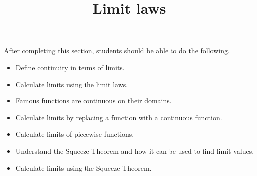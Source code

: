 \documentclass{ximera}
\title{Limit laws}
\begin{document}
\begin{abstract}
\end{abstract}

\maketitle

\begin{sectionOutcomes}
After completing this section, students should be able to do the following.

\begin{itemize}
\item Define continuity in terms of limits.
\item Calculate limits using the limit laws.
\item Famous functions are continuous on their domains. 
\item Calculate limits by replacing a function with a continuous
  function.
\item Calculate limits of piecewise functions.
\item Understand the Squeeze Theorem and how it can be used to find limit values.
\item Calculate limits using the Squeeze Theorem.
\end{itemize}
\end{sectionOutcomes}
\end{document}
